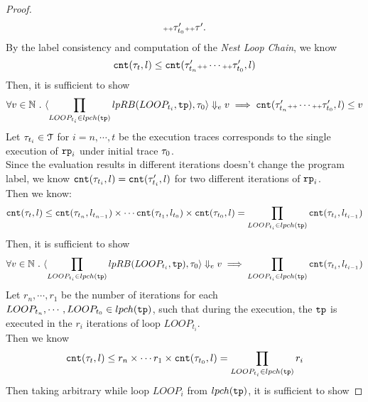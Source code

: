 \begin{proof}
\[\begin{array}{l}
{        {\scriptscriptstyle ++}\ensuremath{\mathtt{\tau}}_{t_0}' {\scriptscriptstyle ++}\ensuremath{\mathtt{\tau}}'}.
          \end{array}
        \]
        By the label consistency and computation of the 
        \emph{Nest Loop Chain}, we know
        \[
          \mathtt{cnt}(\mathtt{\tau}_t, l) \leq \mathtt{cnt}(\mathtt{\tau}_{t_n}' {\scriptscriptstyle ++} \cdots 
          {\scriptscriptstyle ++} \mathtt{\tau}_{t_0}', l)
          \] 
        Then, it is sufficient to show 
        \[
          \forall v \in \mathbb{N} ~.~ 
        \langle \prod_{LOOP_{t_i} \in lpch(\mathtt{tp})} lpRB(LOOP_{t_i}, \mathtt{tp}), \mathtt{\tau}_0
         \rangle \Downarrow_e v 
        \implies  \mathtt{cnt}(\mathtt{\tau}_{t_n}' {\scriptscriptstyle ++} \cdots 
        {\scriptscriptstyle ++} \mathtt{\tau}_{t_0}', l) \leq v
      \]
%
Let $\mathtt{\tau}_{t_i} \in \mathcal{T}$ for $i = n, \cdots, t$ 
be the execution traces corresponds to the single execution of $\mathtt{rp}_i$ under initial trace $\mathtt{\tau}_0$.
\\
Since the evaluation results in different iterations doesn't change the program label,
we know $\mathtt{cnt}(\mathtt{\tau}_{t_i}, l) = \mathtt{cnt}(\mathtt{\tau}_{t_i}', l)$ for two different iterations of $\mathtt{rp}_i$.
\\
Then we know:
\[
  \mathtt{cnt}(\mathtt{\tau}_t, l) \leq 
  \mathtt{cnt}(\mathtt{\tau}_{t_n}, l_{t_{n-1}}) \times \cdots 
  \mathtt{cnt}(\mathtt{\tau}_{t_1}, l_{t_{0}}) \times \mathtt{cnt}(\mathtt{\tau}_{t_0}, l)
  = \prod\limits_{LOOP_{t_i} \in lpch(\mathtt{tp})} \mathtt{cnt}(\mathtt{\tau}_{t_i}, l_{t_{i-1}})
  \]
%
Then, it is sufficient to show 
\[
  \forall v \in \mathbb{N} ~.~ 
\langle \prod_{LOOP_{t_i} \in lpch(\mathtt{tp})} lpRB(LOOP_{t_i}, \mathtt{tp}), \mathtt{\tau}_0
 \rangle \Downarrow_e v 
\implies  
\prod\limits_{LOOP_{t_i} \in lpch(\mathtt{tp})} \mathtt{cnt}(\mathtt{\tau}_{t_i}, l_{t_{i-1}})
\]
%
Let $r_n, \cdots, r_1$ be the number of iterations for each $LOOP_{t_n}, \cdots, LOOP_{t_0} \in lpch(\mathtt{tp})$, 
such that
during the execution,
the $\mathtt{tp}$ is executed in the $r_i$ iterations of loop $LOOP_{t_i}$.
\\
Then we know
\[
  \mathtt{cnt}(\mathtt{\tau}_t, l) \leq 
  r_n \times \cdots 
  r_1 \times \mathtt{cnt}(\mathtt{\tau}_{t_0}, l)
  = 
  \prod\limits_{LOOP_{t_i} \in lpch(\mathtt{tp})} r_i
  \]
%
Then taking arbitrary while loop $LOOP_i$ from $lpch(\mathtt{tp})$, it is sufficient to show

\end{proof}
